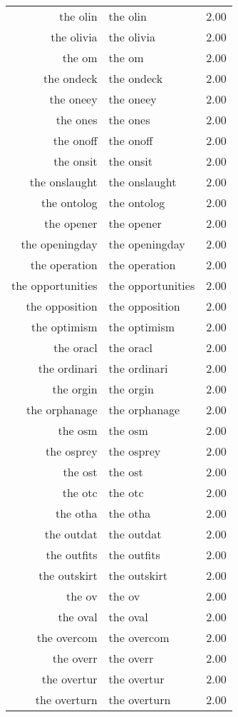 \begin{table}[ht]
\begin{tabular}{rlr}
  the olin & the olin & 2.00 \\ 
  the olivia & the olivia & 2.00 \\ 
  the om & the om & 2.00 \\ 
  the ondeck & the ondeck & 2.00 \\ 
  the oneey & the oneey & 2.00 \\ 
  the ones & the ones & 2.00 \\ 
  the onoff & the onoff & 2.00 \\ 
  the onsit & the onsit & 2.00 \\ 
  the onslaught & the onslaught & 2.00 \\ 
  the ontolog & the ontolog & 2.00 \\ 
  the opener & the opener & 2.00 \\ 
  the openingday & the openingday & 2.00 \\ 
  the operation & the operation & 2.00 \\ 
  the opportunities & the opportunities & 2.00 \\ 
  the opposition & the opposition & 2.00 \\ 
  the optimism & the optimism & 2.00 \\ 
  the oracl & the oracl & 2.00 \\ 
  the ordinari & the ordinari & 2.00 \\ 
  the orgin & the orgin & 2.00 \\ 
  the orphanage & the orphanage & 2.00 \\ 
  the osm & the osm & 2.00 \\ 
  the osprey & the osprey & 2.00 \\ 
  the ost & the ost & 2.00 \\ 
  the otc & the otc & 2.00 \\ 
  the otha & the otha & 2.00 \\ 
  the outdat & the outdat & 2.00 \\ 
  the outfits & the outfits & 2.00 \\ 
  the outskirt & the outskirt & 2.00 \\ 
  the ov & the ov & 2.00 \\ 
  the oval & the oval & 2.00 \\ 
  the overcom & the overcom & 2.00 \\ 
  the overr & the overr & 2.00 \\ 
  the overtur & the overtur & 2.00 \\ 
  the overturn & the overturn & 2.00 \\ 

\end{tabular}
\end{table}
